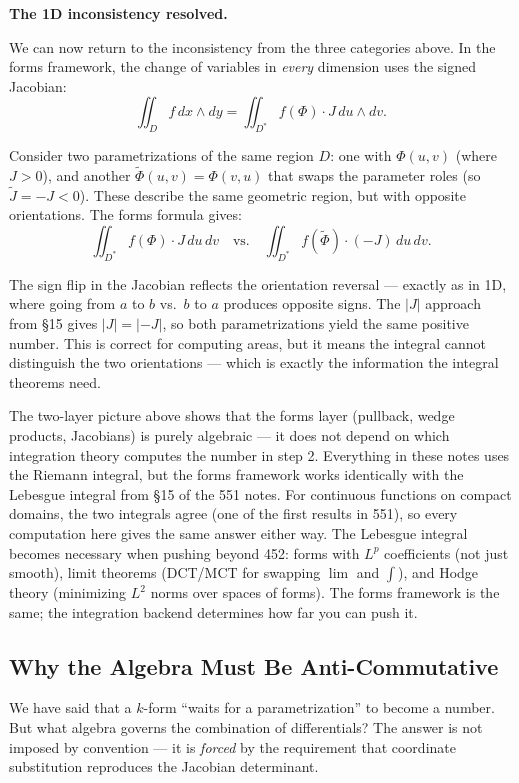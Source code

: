 \documentclass[11pt]{report}
\begin{document}
\textbf{The 1D inconsistency resolved.}

We can now return to the inconsistency from the three categories above. In the forms framework, the change of variables in \textit{every} dimension uses the signed Jacobian:
\[
\iint_D f\,dx \wedge dy = \iint_{D^*} f(\Phi) \cdot J\,du \wedge dv.
\]

Consider two parametrizations of the same region $D$: one with $\Phi(u,v)$ (where $J > 0$), and another $\tilde{\Phi}(u,v) = \Phi(v,u)$ that swaps the parameter roles (so $\tilde{J} = -J < 0$). These describe the same geometric region, but with opposite orientations. The forms formula gives:
\[
\iint_{D^*} f(\Phi) \cdot J\,du\,dv \quad \text{vs.} \quad \iint_{D^*} f(\tilde{\Phi}) \cdot (-J)\,du\,dv.
\]

The sign flip in the Jacobian reflects the orientation reversal --- exactly as in 1D, where going from $a$ to $b$ vs.\ $b$ to $a$ produces opposite signs. The $|J|$ approach from \S15 gives $|J| = |-J|$, so both parametrizations yield the same positive number. This is correct for computing areas, but it means the integral cannot distinguish the two orientations --- which is exactly the information the integral theorems need.

\begin{remark}
The two-layer picture above shows that the forms layer (pullback, wedge products, Jacobians) is purely algebraic --- it does not depend on which integration theory computes the number in step 2. Everything in these notes uses the Riemann integral, but the forms framework works identically with the Lebesgue integral from \S15 of the 551 notes. For continuous functions on compact domains, the two integrals agree (one of the first results in 551), so every computation here gives the same answer either way. The Lebesgue integral becomes necessary when pushing beyond 452: forms with $L^p$ coefficients (not just smooth), limit theorems (DCT/MCT for swapping $\lim$ and $\int$), and Hodge theory (minimizing $L^2$ norms over spaces of forms). The forms framework is the same; the integration backend determines how far you can push it.
\end{remark}

\subsection{Why the Algebra Must Be Anti-Commutative}

We have said that a $k$-form ``waits for a parametrization'' to become a number. But what algebra governs the combination of differentials? The answer is not imposed by convention --- it is \textit{forced} by the requirement that coordinate substitution reproduces the Jacobian determinant.
\end{document}
